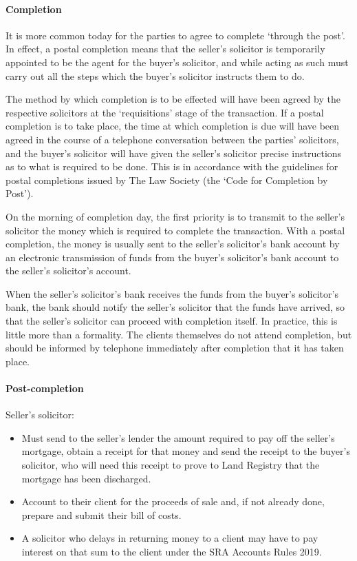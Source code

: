 \documentclass[
]{article}
\providecommand{\tightlist}{%
  \setlength{\itemsep}{0pt}\setlength{\parskip}{0pt}}
\begin{document}
\hypertarget{completion}{%
\paragraph{Completion}\label{completion}}

It is more common today for the parties to agree to complete `through
the post'. In effect, a postal completion means that the seller's
solicitor is temporarily appointed to be the agent for the buyer's
solicitor, and while acting as such must carry out all the steps which
the buyer's solicitor instructs them to do.

The method by which completion is to be effected will have been agreed
by the respective solicitors at the `requisitions' stage of the
transaction. If a postal completion is to take place, the time at which
completion is due will have been agreed in the course of a telephone
conversation between the parties' solicitors, and the buyer's solicitor
will have given the seller's solicitor precise instructions as to what
is required to be done. This is in accordance with the guidelines for
postal completions issued by The Law Society (the `Code for Completion
by Post').

On the morning of completion day, the first priority is to transmit to
the seller's solicitor the money which is required to complete the
transaction. With a postal completion, the money is usually sent to the
seller's solicitor's bank account by an electronic transmission of funds
from the buyer's solicitor's bank account to the seller's solicitor's
account.

When the seller's solicitor's bank receives the funds from the buyer's
solicitor's bank, the bank should notify the seller's solicitor that the
funds have arrived, so that the seller's solicitor can proceed with
completion itself. In practice, this is little more than a formality.
The clients themselves do not attend completion, but should be informed
by telephone immediately after completion that it has taken place.

\hypertarget{post-completion}{%
\paragraph{Post-completion}\label{post-completion}}

Seller's solicitor:

\begin{itemize}
\tightlist
\item
  Must send to the seller's lender the amount required to pay off the
  seller's mortgage, obtain a receipt for that money and send the
  receipt to the buyer's solicitor, who will need this receipt to prove
  to Land Registry that the mortgage has been discharged.
\item
  Account to their client for the proceeds of sale and, if not already
  done, prepare and submit their bill of costs.
\item
  A solicitor who delays in returning money to a client may have to pay
  interest on that sum to the client under the SRA Accounts Rules 2019.
\end{itemize}
\end{document}
